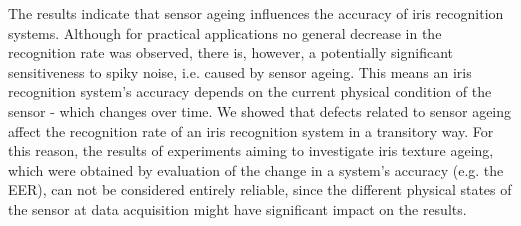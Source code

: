 \documentclass[10pt,twocolumn,letterpaper]{article}
\begin{document}
The results indicate that sensor ageing influences the accuracy of iris recognition systems. Although for practical applications no general decrease in the recognition rate was observed, there is, however, a potentially significant sensitiveness to spiky noise, i.e. caused by sensor ageing. This means an iris recognition system's accuracy depends on the current physical condition of the sensor - which changes over time. We showed that defects related to sensor ageing affect the recognition rate of an iris recognition system in a transitory way. For this reason, the results of experiments aiming to investigate iris texture ageing, which were obtained by evaluation of the change in a system's accuracy (e.g. the EER), can not be considered entirely reliable, since the different physical states of the sensor at data acquisition might have significant impact on the results.  
 
 




{\small


}

\end{document}
